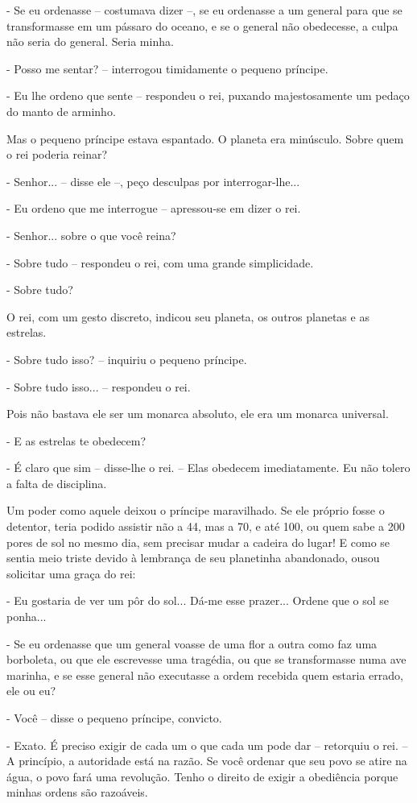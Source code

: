 - Se eu ordenasse -- costumava dizer --, se eu ordenasse a um general
para que se transformasse em um pássaro do oceano, e se o general não
obedecesse, a culpa não seria do general. Seria minha.

- Posso me sentar? -- interrogou timidamente o pequeno príncipe.

- Eu lhe ordeno que sente -- respondeu o rei, puxando majestosamente um
pedaço do manto de arminho.

Mas o pequeno príncipe estava espantado. O planeta era minúsculo. Sobre
quem o rei poderia reinar?

- Senhor... -- disse ele --, peço desculpas por interrogar-lhe...

- Eu ordeno que me interrogue -- apressou-se em dizer o rei.

- Senhor... sobre o que você reina?

- Sobre tudo -- respondeu o rei, com uma grande simplicidade.

- Sobre tudo?

O rei, com um gesto discreto, indicou seu planeta, os outros planetas e
as estrelas.

- Sobre tudo isso? -- inquiriu o pequeno príncipe.

- Sobre tudo isso... -- respondeu o rei.

Pois não bastava ele ser um monarca absoluto, ele era um monarca
universal.

- E as estrelas te obedecem?

- É claro que sim -- disse-lhe o rei. -- Elas obedecem imediatamente. Eu
não tolero a falta de disciplina.

Um poder como aquele deixou o príncipe maravilhado. Se ele próprio fosse
o detentor, teria podido assistir não a 44, mas a 70, e até 100, ou quem
sabe a 200 pores de sol no mesmo dia, sem precisar mudar a cadeira do
lugar! E como se sentia meio triste devido à lembrança de seu planetinha
abandonado, ousou solicitar uma graça do rei:

- Eu gostaria de ver um pôr do sol... Dá-me esse prazer... Ordene que o
sol se ponha...

- Se eu ordenasse que um general voasse de uma flor a outra como faz uma
borboleta, ou que ele escrevesse uma tragédia, ou que se transformasse
numa ave marinha, e se esse general não executasse a ordem recebida quem
estaria errado, ele ou eu?

- Você -- disse o pequeno príncipe, convicto.

- Exato. É preciso exigir de cada um o que cada um pode dar -- retorquiu
o rei. -- A princípio, a autoridade está na razão. Se você ordenar que
seu povo se atire na água, o povo fará uma revolução. Tenho o direito de
exigir a obediência porque minhas ordens são razoáveis.


